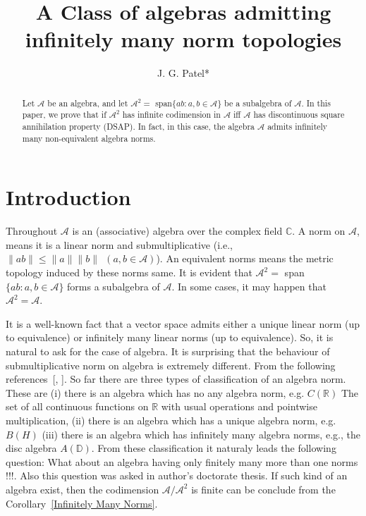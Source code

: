 \documentclass{amsart}
\title[J. G. Patel]%
{A Class of algebras admitting infinitely many norm topologies}
\author{J. G. Patel*}
\theoremstyle{definition}
\numberwithin{equation}{section}
\begin{document}
	
	
	
\begin{abstract}
Let $\mathcal{A}$ be an algebra, and let $\mathcal{A}^2 =$ span$\{ab : a, b \in \mathcal{A}\}$ be a subalgebra of $\mathcal{A}$. In this paper, we prove that if $\mathcal{A}^2$ has infinite codimension in  $\mathcal{A}$ iff $\mathcal{A}$ has discontinuous square annihilation property (DSAP). In fact, in this case, the algebra
$\mathcal{A}$ admits infinitely many non-equivalent algebra norms.
\end{abstract}
\maketitle
\section{Introduction}
Throughout $\mathcal{A}$ is an (associative) algebra over the complex field $\mathbb{C}$. A norm on $\mathcal{A}$, means it is a linear norm and submultiplicative (i.e., $\| ab \| \leq \|a\| \|b\| \ \ (a,b \in \mathcal{A})$). An equivalent norms means the metric topology induced by these norms same. It is evident that $\mathcal{A}^2 =$ span$\{ab : a, b \in \mathcal{A}\}$ forms a subalgebra of $\mathcal{\mathcal{A}}$. In some cases, it may happen that $\mathcal{A}^2 = \mathcal{A}$.

It is a well-known fact that a vector space admits either a unique linear norm (up to equivalence) or infinitely many linear norms (up to equivalence). So, it is natural to ask for the case of algebra. It is surprising that the behaviour of submultiplicative norm on algebra is extremely different. From the following references~[\cite{DL:97}, \cite{DP:22(a)}]. So far there are three types of classification of an algebra norm. These are (i) there is an algebra which has no any algebra norm, e.g. $C(\mathbb{R})$ The set of all continuous functions on $\mathbb{R}$ with usual operations and pointwise multiplication, (ii) there is an algebra which has a unique algebra norm, e.g. $B(H)$ (iii) there is an algebra which has infinitely many algebra norms, e.g., the disc algebra $A(\mathbb{D})$. From these classification it naturaly leads the following question: What about an algebra having only finitely many more than one norms !!!. Also this question was asked in author's doctorate thesis. If such kind of an algebra exist, then the codimension $\mathcal{A}/ \mathcal{A}^2$ is finite can be conclude from the Corollary~\ref{Infinitely Many Norms}.
\end{document}
